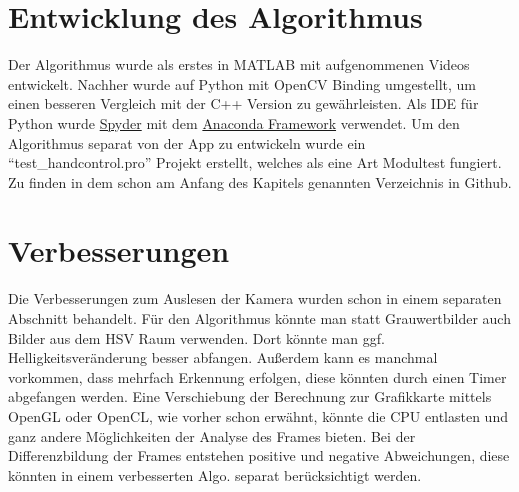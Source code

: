 \section{Entwicklung des Algorithmus}
Der Algorithmus wurde als erstes in MATLAB mit aufgenommenen Videos entwickelt. Nachher wurde auf Python mit OpenCV Binding umgestellt, um einen besseren Vergleich mit der C++ Version zu gewährleisten. Als IDE für Python wurde \href{https://github.com/spyder-ide/spyder}{Spyder} mit dem \href{https://www.continuum.io/downloads}{Anaconda Framework} verwendet. Um den Algorithmus separat von der App zu entwickeln wurde ein "`test\_handcontrol.pro"' Projekt erstellt, welches als eine Art Modultest fungiert. Zu finden in dem schon am Anfang des Kapitels genannten Verzeichnis in Github.

\section{Verbesserungen}
Die Verbesserungen zum Auslesen der Kamera wurden schon in einem separaten Abschnitt behandelt. Für den Algorithmus könnte man statt Grauwertbilder auch Bilder aus dem HSV Raum verwenden. Dort könnte man ggf. Helligkeitsveränderung besser abfangen. Außerdem kann es manchmal vorkommen, dass mehrfach Erkennung erfolgen, diese könnten durch einen Timer abgefangen werden. Eine Verschiebung der Berechnung zur Grafikkarte mittels OpenGL oder OpenCL, wie vorher schon erwähnt, könnte die CPU entlasten und ganz andere Möglichkeiten der Analyse des Frames bieten. Bei der Differenzbildung der Frames entstehen positive und negative Abweichungen, diese könnten in einem verbesserten Algo. separat berücksichtigt werden.
